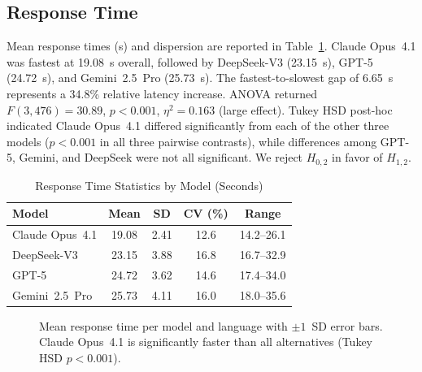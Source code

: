 \documentclass[twocolumn,11pt]{article}
\begin{document}
    \subsection{Response Time}
    Mean response times (s) and dispersion are reported in Table~\ref{tab:time}. Claude Opus~4.1 was fastest at 19.08~s overall, followed by DeepSeek-V3 (23.15~s), GPT-5 (24.72~s), and Gemini~2.5~Pro (25.73~s). The fastest-to-slowest gap of 6.65~s represents a 34.8\% relative latency increase. ANOVA returned $F(3,476) = 30.89$, $p < 0.001$, $\eta^2 = 0.163$ (large effect). Tukey HSD post-hoc indicated Claude Opus~4.1 differed significantly from each of the other three models ($p < 0.001$ in all three pairwise contrasts), while differences among GPT-5, Gemini, and DeepSeek were not all significant. We reject $H_{0,2}$ in favor of $H_{1,2}$.
    \begin{table}[!t]
    \caption{Response Time Statistics by Model (Seconds)}\label{tab:time}
    \centering\small
    \begin{tabular}{@{}lcccc@{}}\toprule
    Model & Mean & SD & CV (\%) & Range \\\midrule
    Claude Opus~4.1 & 19.08 & 2.41 & 12.6 & 14.2--26.1 \\
    DeepSeek-V3 & 23.15 & 3.88 & 16.8 & 16.7--32.9 \\
    GPT-5 & 24.72 & 3.62 & 14.6 & 17.4--34.0 \\
    Gemini~2.5~Pro & 25.73 & 4.11 & 16.0 & 18.0--35.6 \\\bottomrule
    \end{tabular}
    \end{table}
    \begin{figure}[!t]
    \centering
    \caption{Mean response time per model and language with $\pm 1$~SD error bars. Claude Opus~4.1 is significantly faster than all alternatives (Tukey HSD $p < 0.001$).}
    \label{fig:time}
    \end{figure}
\end{document}
